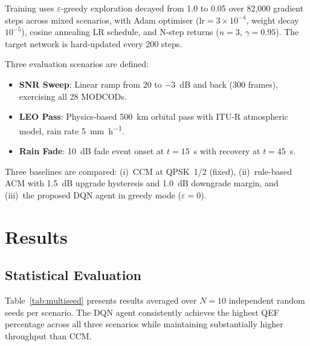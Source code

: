 \documentclass[conference]{IEEEtran}
\begin{document}
Training uses $\varepsilon$-greedy exploration decayed from 1.0 to 0.05 over 82,000 gradient steps across mixed scenarios, with Adam optimiser ($\text{lr} = 3 \times 10^{-4}$, weight decay $10^{-5}$), cosine annealing LR schedule, and N-step returns ($n{=}3$, $\gamma{=}0.95$). The target network is hard-updated every 200 steps.

Three evaluation scenarios are defined:
\begin{itemize}
\item \textbf{SNR Sweep}: Linear ramp from 20 to $-3$~dB and back (300 frames), exercising all 28 MODCODs.
\item \textbf{LEO Pass}: Physics-based \SI{500}{\kilo\metre} orbital pass with ITU-R atmospheric model, rain rate \SI{5}{\milli\metre\per\hour}.
\item \textbf{Rain Fade}: \SI{10}{\deci\bel} fade event onset at $t{=}15$~s with recovery at $t{=}45$~s.
\end{itemize}

Three baselines are compared: (i)~CCM at QPSK~1/2 (fixed), (ii)~rule-based ACM with \SI{1.5}{\deci\bel} upgrade hysteresis and \SI{1.0}{\deci\bel} downgrade margin, and (iii)~the proposed DQN agent in greedy mode ($\varepsilon{=}0$).

\section{Results}

\subsection{Statistical Evaluation}

Table~\ref{tab:multiseed} presents results averaged over $N{=}10$ independent random seeds per scenario. The DQN agent consistently achieves the highest QEF percentage across all three scenarios while maintaining substantially higher throughput than CCM.
\end{document}
